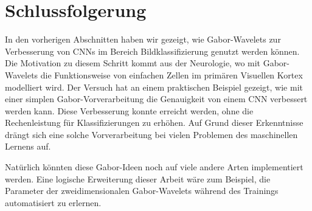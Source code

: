 \section{Schlussfolgerung}

In den vorherigen Abschnitten haben wir gezeigt, wie Gabor-Wavelets zur Verbesserung von CNNs im Bereich Bildklassifizierung genutzt werden können.
Die Motivation zu diesem Schritt kommt aus der Neurologie, wo mit Gabor-Wavelets die Funktionsweise von einfachen Zellen im primären Visuellen Kortex modelliert wird.
Der Versuch hat an einem praktischen Beispiel gezeigt, wie mit einer simplen Gabor-Vorverarbeitung die Genauigkeit von einem CNN verbessert werden kann.
Diese Verbesserung konnte erreicht werden, ohne die Rechenleistung für Klassifizierungen zu erhöhen.
Auf Grund dieser Erkenntnisse drängt sich eine solche Vorverarbeitung bei vielen Problemen des maschinellen Lernens auf. 

Natürlich könnten diese Gabor-Ideen noch auf viele andere Arten implementiert werden.
Eine logische Erweiterung dieser Arbeit wäre zum Beispiel, die Parameter der zweidimensionalen Gabor-Wavelets während des Trainings automatisiert zu erlernen.
